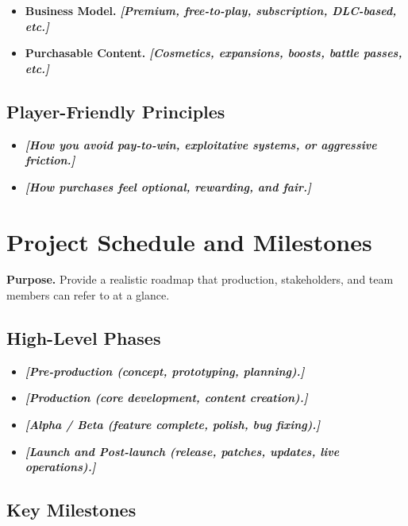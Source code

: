 \documentclass[12pt]{article}
\newcommand{\placeholder}[1]{\textbf{\textit{[#1]}}}
\begin{document}
\begin{itemize}
    \item \textbf{Business Model.} \placeholder{Premium, free-to-play, subscription, DLC-based, etc.}
    \item \textbf{Purchasable Content.} \placeholder{Cosmetics, expansions, boosts, battle passes, etc.}
\end{itemize}

\subsection{Player-Friendly Principles}

\begin{itemize}
    \item \placeholder{How you avoid pay-to-win, exploitative systems, or aggressive friction.}
    \item \placeholder{How purchases feel optional, rewarding, and fair.}
\end{itemize}

\section{Project Schedule and Milestones}

\textbf{Purpose.} Provide a realistic roadmap that production, stakeholders, and team members can
refer to at a glance.

\subsection{High-Level Phases}

\begin{itemize}
    \item \placeholder{Pre-production (concept, prototyping, planning).}
    \item \placeholder{Production (core development, content creation).}
    \item \placeholder{Alpha / Beta (feature complete, polish, bug fixing).}
    \item \placeholder{Launch and Post-launch (release, patches, updates, live operations).}
\end{itemize}

\subsection{Key Milestones}
\end{document}
